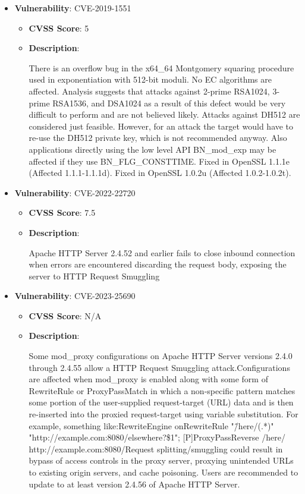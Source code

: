 \documentclass{article}
\begin{document}
\begin{itemize}
        \item \textbf{Vulnerability}: CVE-2019-1551
        \begin{itemize}
            \item \textbf{CVSS Score}:  5 
            \item \textbf{Description}:
            \parbox[t]{0.9\linewidth}{
                \ttfamily There is an overflow bug in the x64\_64 Montgomery squaring procedure used in exponentiation with 512-bit moduli. No EC algorithms are affected. Analysis suggests that attacks against 2-prime RSA1024, 3-prime RSA1536, and DSA1024 as a result of this defect would be very difficult to perform and are not believed likely. Attacks against DH512 are considered just feasible. However, for an attack the target would have to re-use the DH512 private key, which is not recommended anyway. Also applications directly using the low level API BN\_mod\_exp may be affected if they use BN\_FLG\_CONSTTIME. Fixed in OpenSSL 1.1.1e (Affected 1.1.1-1.1.1d). Fixed in OpenSSL 1.0.2u (Affected 1.0.2-1.0.2t).
            }
        \end{itemize}
    
        \item \textbf{Vulnerability}: CVE-2022-22720
        \begin{itemize}
            \item \textbf{CVSS Score}:  7.5 
            \item \textbf{Description}:
            \parbox[t]{0.9\linewidth}{
                \ttfamily Apache HTTP Server 2.4.52 and earlier fails to close inbound connection when errors are encountered discarding the request body, exposing the server to HTTP Request Smuggling
            }
        \end{itemize}
    
        \item \textbf{Vulnerability}: CVE-2023-25690
        \begin{itemize}
            \item \textbf{CVSS Score}:  N/A 
            \item \textbf{Description}:
            \parbox[t]{0.9\linewidth}{
                \ttfamily Some mod\_proxy configurations on Apache HTTP Server versions 2.4.0 through 2.4.55 allow a HTTP Request Smuggling attack.Configurations are affected when mod\_proxy is enabled along with some form of RewriteRule or ProxyPassMatch in which a non-specific pattern matches some portion of the user-supplied request-target (URL) data and is then re-inserted into the proxied request-target using variable substitution. For example, something like:RewriteEngine onRewriteRule "\^/here/(.*)" "http://example.com:8080/elsewhere?\$1"; [P]ProxyPassReverse /here/ http://example.com:8080/Request splitting/smuggling could result in bypass of access controls in the proxy server, proxying unintended URLs to existing origin servers, and cache poisoning. Users are recommended to update to at least version 2.4.56 of Apache HTTP Server.
            }
        \end{itemize}
    

\end{itemize}
\end{document}
